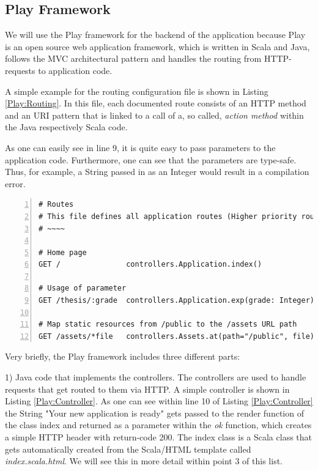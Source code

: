 \subsection{Play Framework}	
\label{Play2}
We will use the Play framework for the backend of the application because Play is an open source web application framework, which is written in Scala and Java, follows the \ac{MVC} architectural pattern and handles the routing from \ac{HTTP}-requests to application code. 

A simple example for the routing configuration file is shown in Listing \ref{Play:Routing}. In this file, each documented route consists of an \ac{HTTP} method and an \ac{URI} pattern that is linked to a call of a, so called, \textit{action method} within the Java respectively Scala code. 

As one can easily see in line 9, it is quite easy to pass parameters to the application code. Furthermore, one can see that the parameters are type-safe. Thus, for example, a String passed in as an Integer would result in a compilation error. 

\begin{lstlisting}[numbers=left,caption={Simple routing configuration file within the Play Framework},label=Play:Routing,frame=tlbr,breaklines]
# Routes
# This file defines all application routes (Higher priority routes first)
# ~~~~

# Home page
GET /               controllers.Application.index()

# Usage of parameter
GET /thesis/:grade  controllers.Application.exp(grade: Integer)

# Map static resources from /public to the /assets URL path
GET /assets/*file   controllers.Assets.at(path="/public", file)
\end{lstlisting}

Very briefly, the Play framework includes three different parts: 

1) Java code that implements the controllers. The controllers are used to handle requests that get routed to them via \ac{HTTP}. A simple controller is shown in Listing \ref{Play:Controller}. As one can see within line 10 of Listing \ref{Play:Controller} the String "Your new application is ready" gets passed to the render function of the class index and returned as a parameter within the \textit{ok} function, which creates a simple \ac{HTTP} header with return-code 200. The index class is a Scala class that gets automatically created from the Scala/\acs{HTML} template called \textit{index.scala.html}. We will see this in more detail within point 3 of this list.

